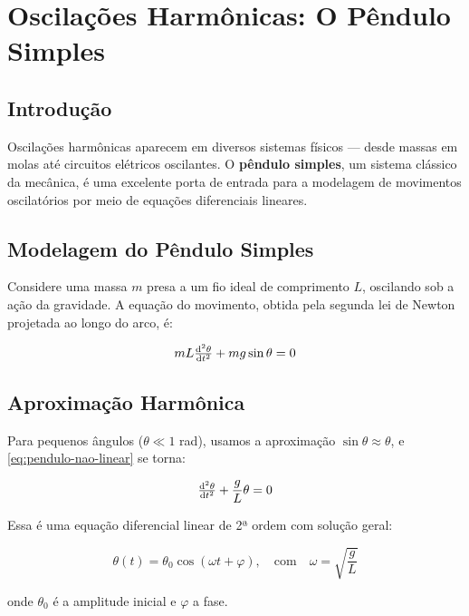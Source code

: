 \chapter{Oscilações Harmônicas: O Pêndulo Simples}
\label{chap:pendulo}

\section{Introdução}

Oscilações harmônicas aparecem em diversos sistemas físicos — desde massas em molas até circuitos elétricos oscilantes. O \textbf{pêndulo simples}, um sistema clássico da mecânica, é uma excelente porta de entrada para a modelagem de movimentos oscilatórios por meio de equações diferenciais lineares.

\section{Modelagem do Pêndulo Simples}

Considere uma massa $m$ presa a um fio ideal de comprimento $L$, oscilando sob a ação da gravidade.
A equação do movimento, obtida pela segunda lei de Newton projetada ao longo do arco, é:

\begin{equation}
    mL\od[2]{\theta}{t} + mg\sin\theta = 0
    \label{eq:pendulo-nao-linear}
\end{equation}

\section{Aproximação Harmônica}

Para pequenos ângulos ($\theta \ll 1$ rad), usamos a aproximação $\sin\theta \approx \theta$, e \eqref{eq:pendulo-nao-linear} se torna:

\begin{equation}
    \od[2]{\theta}{t} + \frac{g}{L}\theta = 0
    \label{eq:pendulo-linear}
\end{equation}

Essa é uma equação diferencial linear de 2ª ordem com solução geral:

\begin{equation}
    \theta(t) = \theta_0 \cos\left( \omega t + \varphi \right), \quad \text{com} \quad \omega = \sqrt{\frac{g}{L}}
\end{equation}

onde $\theta_0$ é a amplitude inicial e $\varphi$ a fase.

